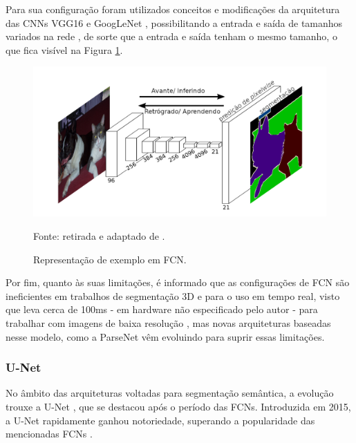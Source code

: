 Para sua configuração foram utilizados conceitos e modificações da arquitetura das CNNs VGG16 \citep{Simonyan2015} e GoogLeNet \citep{Szegedy2015}, possibilitando a entrada e saída de tamanhos variados na rede \citep{Minaee2021}, de sorte que a entrada e saída tenham o mesmo tamanho, o que fica visível na Figura \ref{semantic:fig:6}.

\begin{figure}[H]
    \centering
    \caption{Representação de exemplo em FCN.}
    \includegraphics[width=1\linewidth]{recursos/imagens/semantic/fcn_example.png}
    \label{semantic:fig:6}

    Fonte: retirada e adaptado de \cite{Shelhamer2016}.
\end{figure}

Por fim, quanto às suas limitações, é informado que as configurações de FCN são ineficientes em trabalhos de segmentação 3D e para o uso em tempo real, visto que leva cerca de 100ms - em hardware não especificado pelo autor - para trabalhar com imagens de baixa resolução \citep{Minaee2021}, mas novas arquiteturas baseadas nesse modelo, como a ParseNet \citep{Liu2015} vêm evoluindo para suprir essas limitações.

\subsubsection{U-Net}
\label{semantic:unet}

No âmbito das arquiteturas voltadas para segmentação semântica, a evolução trouxe a U-Net \citep{Ronneberger2015U-net:Segmentation}, que se destacou após o período das FCNs. Introduzida em 2015, a U-Net rapidamente ganhou notoriedade, superando a popularidade das mencionadas FCNs \citep{Sultana2020EvolutionSurvey}.

